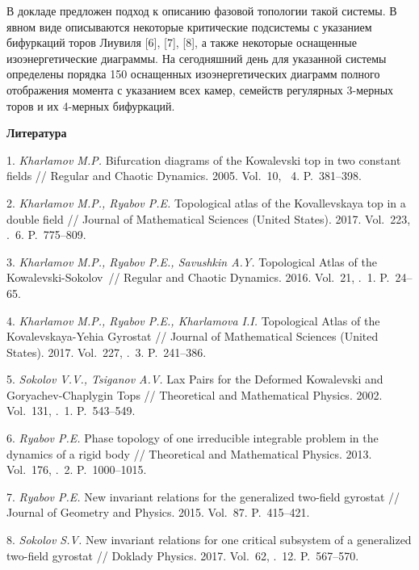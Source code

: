 
В докладе предложен подход к описанию фазовой топологии такой системы. В явном виде описываются некоторые критические подсистемы с указанием бифуркаций торов Лиувиля [6], [7], [8], а также некоторые оснащенные изоэнергетические диаграммы. На сегодняшний день для указанной системы определены порядка 150 оснащенных  изоэнергетических диаграмм полного отображения момента с указанием всех камер, семейств регулярных 3-мерных торов и  их 4-мерных бифуркаций.



\smallskip \centerline {\bf Литература} \nopagebreak

1. {\it Kharlamov M.P.} Bifurcation diagrams of the Kowalevski top in two constant fields // Regular and Chaotic Dynamics. 2005. Vol.~10, \No~4. P.~381--398.

2. {\it Kharlamov M.P., Ryabov P.E.} Topological atlas of the Kovallevskaya
top in a double field // Journal of Mathematical Sciences (United
States). 2017. Vol.~223, \No.~6. P.~775--809.

3. {\it Kharlamov M.P., Ryabov P.E., Savushkin A.Y.} Topologi\-cal Atlas of the
Kowalevski-Sokolov~// Regular and Chaotic Dynamics. 2016. Vol.~21, \No.~1. P.~24--65.

4. {\it Kharlamov M.P., Ryabov P.E., Kharlamova I.I.} Topo\-lo\-gical At\-las of the Kovalevskaya-Yehia Gyrostat // Journal of Mathe\-ma\-tical Sciences (United States). 2017. Vol.~227, \No.~3. P.~241--386.

5. {\it Sokolov V.V., Tsiganov A.V.} Lax Pairs for the Deformed Kowalevski and Goryachev-Chaplygin Tops // Theoretical and Mathematical Physics. 2002. Vol.~131, \No.~1.  P.~543--549.

6. {\it Ryabov P.E.} Phase topology of one irreducible integrable problem in the dynamics of a rigid body // Theoretical and Mathematical Physics. 2013. Vol.~176, \No.~2.  P.~1000--1015.

7. {\it Ryabov P.E.} New invariant relations for the generalized two-field gyrostat // Journal of Geometry and Physics. 2015. Vol.~87. P.~415--421.

8. {\it Sokolov S.V.} New invariant relations for one critical sub\-system of a generalized two-field gyrostat //  Doklady Physics. 2017. Vol.~62, \No.~12. P.~567--570.

